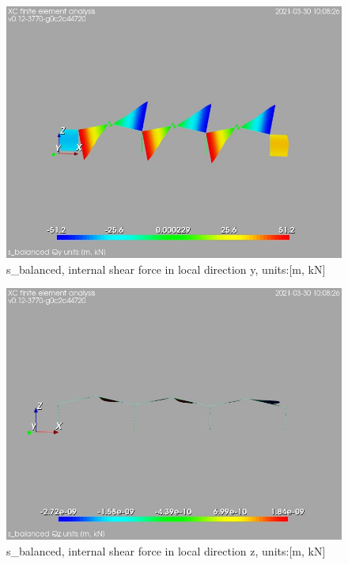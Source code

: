 \begin{figure}
\begin{center}
\includegraphics[width=\linewidth]{calc_results/sole_zeinali/text/graphics/resSimplLC/s_balancedallMemberSetQy}
\caption{s_balanced, internal shear force in local direction y, units:[m, kN]}
\end{center}
\end{figure}
\begin{figure}
\begin{center}
\includegraphics[width=\linewidth]{calc_results/sole_zeinali/text/graphics/resSimplLC/s_balancedallMemberSetQz}
\caption{s_balanced, internal shear force in local direction z, units:[m, kN]}
\end{center}
\end{figure}
